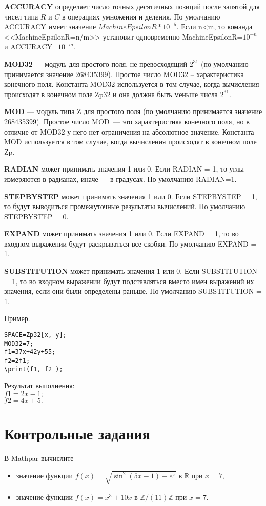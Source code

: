 {\bf ACCURACY} определяет число точных десятичных позиций после запятой для чисел типа $R$ и $C$ в 
операциях умножения и деления. По умолчанию ACCURACY имеет значение $MachineEpsilonR * 10^{-5}$.  
Если n<m, то команда <<MachineEpsilonR=n/m>> установит одновременно MachineEpsilonR=$10^{-n}$ 
и ACCURACY=$10^{-m}$.



{\bf MOD32} --- модуль для простого поля,  не превосходящий $2^{31}$ (по умолчанию принимается значение 268435399). Простое число MOD32 -- характеристика конечного поля.
Константа MOD32 используется в том случае, когда вычисления происходят в конечном поле 
Zp32 и она должна быть меньше числа $2^{31}$. 

{\bf MOD} --- модуль типа Z для простого поля (по умолчанию принимается значение 268435399).  Простое число MOD~--- это характеристика конечного поля, но в отличие от MOD32 у него нет ограничения на абсолютное значение. Константа MOD используется в том случае, когда вычисления происходят в конечном поле 
Zp.

{\bf RADIAN} может принимать значения 1 или 0. Если  RADIAN = 1, то углы измеряются в радианах, иначе --- в градусах. По умолчанию RADIAN=1.

{\bf STEPBYSTEP}  может принимать значения 1 или 0. Если  STEPBYSTEP = 1, то будут выводиться промежуточные результаты вычислений. По умолчанию STEPBYSTEP = 0.

{\bf EXPAND}  может принимать значения 1 или 0. Если EXPAND = 1, то во входном выражении будут раскрываться все скобки. По умолчанию EXPAND = 1.

{\bf SUBSTITUTION}  может принимать значения 1 или 0. Если SUBSTITUTION = 1, то во входном выражении будут подставляться вместо имен выражений их значения, если они были определены раньше. По умолчанию SUBSTITUTION = 1.


\smallskip

\underline{Пример. }

\vspace*{-3mm}

\begin{verbatim}
SPACE=Zp32[x, y]; 
MOD32=7; 
f1=37x+42y+55; 
f2=2f1;  
\print(f1, f2 );
\end{verbatim}

Результат выполнения:\\
$f1 = 2x-1; $ \\
$f2 = 4x+5. $
\section{Контрольные задания}
В Mathpar вычислите 
\begin{itemize}
 \item значение функции $f(x)=\sqrt{\sin ^2(5x-1)+e^x}$ в $\mathbb{R}$ при $x=7$, 
 \item значение функции $f(x)=x^3+10x$ в $\mathbb{Z}/(11)\mathbb{Z}$ при $x=7$. 
 \end{itemize}
